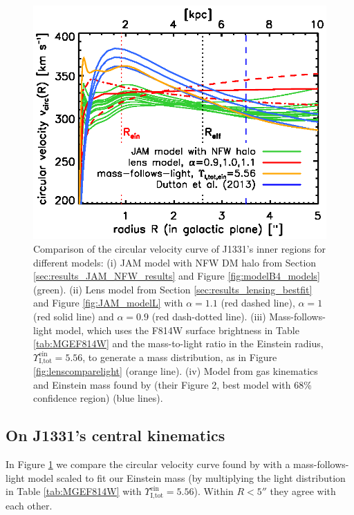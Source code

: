 \documentclass[useAMS,usenatbib]{mnras}
\begin{document}
\begin{figure}
\centering
\includegraphics[width=0.9\linewidth]{fig/B4_jam_profiles_errors_short_vcirc.ps}
\caption{Comparison of the circular velocity curve of J1331's inner regions for different models: (i) JAM model with NFW DM halo from Section \ref{sec:results_JAM_NFW_results} and Figure \ref{fig:modelB4_models} (green). (ii) Lens model from Section \ref{sec:results_lensing_bestfit} and Figure \ref{fig:JAM_modelL} with $\alpha = 1.1$ (red dashed line), $\alpha = 1$ (red solid line) and $\alpha=0.9$ (red dash-dotted line). (iii) Mass-follows-light model, which uses the F814W surface brightness in Table \ref{tab:MGEF814W} and the mass-to-light ratio in the Einstein radius, $\Upsilon^\text{ein}_\text{I,tot} = 5.56$, to generate a mass distribution, as in Figure \ref{fig:lenscomparelight} (orange line).  (iv) Model from gas kinematics and Einstein mass found by \citet{SWELLSV} (their Figure 2, best model with 68\% confidence region) (blue lines).}
\label{fig:vcirc_comparison}
\end{figure}

\subsection{On J1331's central kinematics}

In Figure \ref{fig:vcirc_comparison} we compare the circular velocity curve found by \citet{SWELLSV} with a mass-follows-light model scaled to fit our Einstein mass (by multiplying the light distribution in Table \ref{tab:MGEF814W} with $\Upsilon_\text{I,tot}^\text{ein} = 5.56$). Within $R < 5''$ they agree with each other. 
\end{document}

